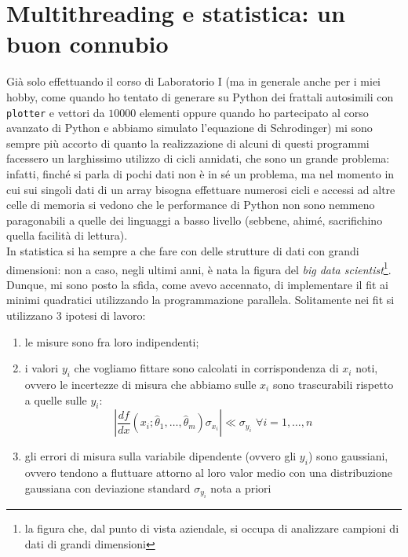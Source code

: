\documentclass{report}
\begin{document}
\section{Multithreading e statistica: un buon connubio}
Già solo effettuando il corso di Laboratorio I (ma in generale anche per i miei hobby, come quando ho tentato di generare su Python dei frattali autosimili con \texttt{plotter} e vettori da $10000$ elementi oppure quando ho partecipato al corso avanzato di Python e abbiamo simulato l'equazione di Schrodinger) mi sono sempre più accorto di quanto la realizzazione di alcuni di questi programmi facessero un larghissimo utilizzo di cicli annidati, che sono un grande problema: infatti, finché si parla di pochi dati non è in sé un problema, ma nel momento in cui sui singoli dati di un array bisogna effettuare numerosi cicli e accessi ad altre celle di memoria si vedono che le performance di Python non sono nemmeno paragonabili a quelle dei linguaggi a basso livello (sebbene, ahimé, sacrifichino quella facilità di lettura). \\
In statistica si ha sempre a che fare con delle strutture di dati con grandi dimensioni: non a caso, negli ultimi anni, è nata la figura del \emph{big data scientist}\footnote{la figura che, dal punto di vista aziendale, si occupa di analizzare campioni di dati di grandi dimensioni}. Dunque, mi sono posto la sfida, come avevo accennato, di implementare il fit ai minimi quadratici utilizzando la programmazione parallela. Solitamente nei fit si utilizzano 3 ipotesi di lavoro:
\begin{enumerate}[label=\protect\circled{\arabic*}]
	\item le misure sono fra loro indipendenti;
	\item i valori $y_i$ che vogliamo fittare sono calcolati in corrispondenza di $x_i$ noti, ovvero le incertezze di misura che abbiamo sulle $x_i$ sono trascurabili rispetto a quelle sulle $y_i$:
	\begin{equation}
		\left| \frac{df}{dx}(x_i; \hat{\theta}_1, \ldots, \hat{\theta}_m) \sigma_{x_i} \right| \ll \sigma_{y_i} \, \, \forall i = 1, \ldots, n
	\end{equation}
	\item gli errori di misura sulla variabile dipendente (ovvero gli $y_i$) sono gaussiani, ovvero tendono a fluttuare attorno al loro valor medio con una distribuzione gaussiana con deviazione standard $\sigma_{y_i}$ nota a priori
\end{enumerate}
\end{document}
